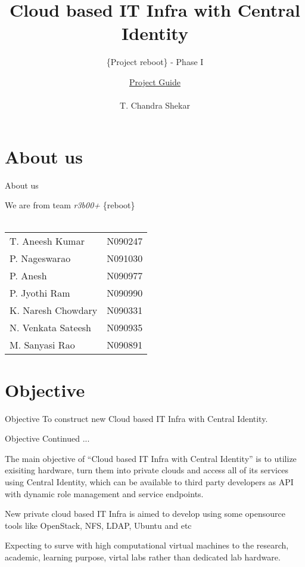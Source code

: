 \documentclass[xcolor=dvipsnames]{beamer}
\title[Cloud based IT Infra with Central Identity]{Cloud based IT Infra with Central Identity}
\subtitle{\{Project reboot\} - Phase I  }
\author{ \underline{Project Guide} \\ \hspace{2mm} \\ \small{ T. Chandra Shekar }  }
\institute{ \underline{Presenting by} \\ \hspace{2mm} \\ \textit {Team r3b00+ }  \\ \hspace{4mm} \\ \textit{Dept. of CSE, RGUKT - Nuzvid}}
\begin{document}
\begin{frame}
\titlepage
\end{frame}

\section{About us}
\begin{frame}{About us}

\small
\begin{center}
We are from team \textit{r3b00+}  \{reboot\} \\ \hspace{4cm} \\
\begin{tabular}{l  l }
T. Aneesh Kumar & N090247   \\
P. Nageswarao  & N091030  \\
P. Anesh  & N090977 \\
P. Jyothi Ram & N090990 \\
K. Naresh Chowdary  & N090331 \\
N. Venkata Sateesh  & N090935 \\
M. Sanyasi Rao & N090891  
\end{tabular}


\end{center}


\end{frame}

\section{Objective}
\begin{frame}{Objective}
To construct new Cloud based IT Infra with Central Identity.
\end{frame}

\begin{frame}{Objective Continued ...}

The main objective of ``Cloud based IT Infra with Central Identity'' is to utilize exisiting hardware, turn them into private clouds and access all of its services using 
Central Identity, which can be available to third party developers as API with dynamic role management and service endpoints. \newline

New private cloud based IT Infra is aimed to develop using some opensource tools like OpenStack, NFS, LDAP, Ubuntu and etc \newline

Expecting to surve with high computational virtual machines to the research, academic, learning purpose, virtal labs rather than dedicated lab hardware.
\end{frame}
\end{document}
